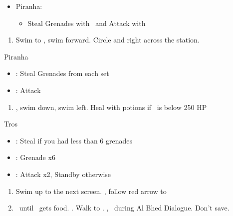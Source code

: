 \begin{encounters}
	\begin{itemize}
		\item Piranha:
		      \begin{itemize}
			      \item Steal Grenades with \rikku \ and Attack with \tidus
		      \end{itemize}
	\end{itemize}
\end{encounters}
\begin{enumerate}[resume]
	\item Swim to \save, swim forward. Circle and right across the station.
\end{enumerate}
\begin{battle}{Piranha}
	\begin{itemize}
		\item \rikku: Steal Grenades from each set
		\item \tidus: Attack
	\end{itemize}
\end{battle}
\begin{enumerate}[resume]
	\item \cs, swim down, swim left. Heal with potions if \rikku\ is  below 250 HP
\end{enumerate}
\begin{battle}[2200]{Tros}
	\begin{itemize}
		\item \rikku: Steal if you had less than 6 grenades
		\item \rikku: Grenade x6
		\item \tidus: Attack x2, Standby otherwise
	\end{itemize}
\end{battle}
\begin{enumerate}[resume]
	\item Swim up to the next screen. \cs, follow red arrow to \cs[0:50]
	\item \sd\ until \tidus \ gets food. \cs[3:00]. Walk to \rikku. \cs[2:30], \sd\ during Al Bhed Dialogue. Don't save.
\end{enumerate}